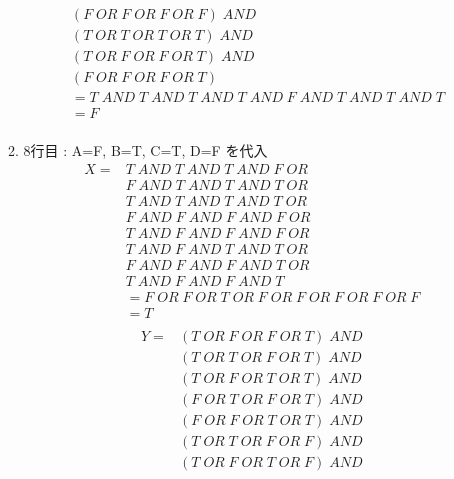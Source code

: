 \documentclass[dvipdfmx,10pt, a4j]{jarticle}
\theoremstyle{definition}
\begin{document}
\begin{enumerate}[i)]
\begin{enumerate}[1)]
\begin{align*}
                & (F\; OR\; F\; OR\; F\; OR\; F)\; AND\\
                & (T\; OR\; T\; OR\; T\; OR\; T)\; AND\\
                & (T\; OR\; F\; OR\; F\; OR\; T)\; AND\\
                & (F\; OR\; F\; OR\; F\; OR\; T)\\
                &= T\; AND\; T\; AND\; T\; AND\; T\; AND\; F\; AND\; T\; AND\; T\; AND\; T\\
                &= F\\
            \end{align*}
            \item 8行目 : A=F, B=T, C=T, D=F を代入\\
            \begin{align*}
                X = &T\; AND\; T\; AND\; T\; AND\; F\; OR\\
                &F\; AND\; T\; AND\; T\; AND\; T\; OR\\
                &T\; AND\; T\; AND\; T\; AND\; T\; OR\\
                &F\; AND\; F\; AND\; F\; AND\; F\; OR\\
                &T\; AND\; F\; AND\; F\; AND\; F\; OR\\
                &T\; AND\; F\; AND\; T\; AND\; T\; OR\\
                &F\; AND\; F\; AND\; F\; AND\; T\; OR\\
                &T\; AND\; F\; AND\; F\; AND\; T\\
                &= F\; OR\; F\; OR\; T\; OR\; F\; OR\; F\; OR\; F\; OR\; F\; OR\; F\\
                &= T\\
            \end{align*}
            \begin{align*}
                Y = & (T\; OR\; F\; OR\; F\; OR\; T) \; AND\\
                & (T\; OR\; T\; OR\; F\; OR\; T)\; AND\\
                & (T\; OR\; F\; OR\; T\; OR\; T)\; AND\\
                & (F\; OR\; T\; OR\; F\; OR\; T)\; AND\\
                & (F\; OR\; F\; OR\; T\; OR\; T)\; AND\\
                & (T\; OR\; T\; OR\; F\; OR\; F)\; AND\\
                & (T\; OR\; F\; OR\; T\; OR\; F)\; AND\\

\end{align*}
\end{enumerate}
\end{enumerate}
\end{document}
